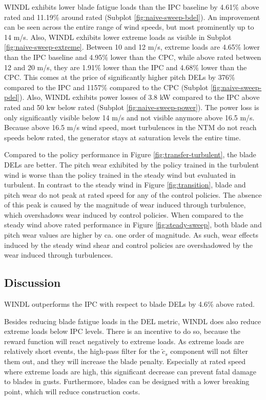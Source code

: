 WINDL exhibits lower blade fatigue loads than the IPC baseline by 4.61\% above rated and 11.19\% around rated (Subplot \ref{fig:naive-sweep-bdel}). An improvement can be seen across the entire range of wind speeds, but most prominently up to 14 m/s. Also, WINDL exhibits lower extreme loads as visible in Subplot \ref{fig:naive-sweep-extreme}. Between 10 and 12 m/s, extreme loads are 4.65\% lower than the IPC baseline and 4.95\% lower than the CPC, while above rated between 12 and 20 m/s, they are 1.91\% lower than the IPC and 4.68\% lower than the CPC. This comes at the price of significantly higher pitch DELs by 376\% compared to the IPC and 1157\% compared to the CPC (Subplot \ref{fig:naive-sweep-pdel}). Also, WINDL exhibits power losses of 3.8 kW compared to the IPC above rated and 50 kw below rated (Subplot \ref{fig:naive-sweep-power}). The power loss is only significantly visible below 14 m/s and not visible anymore above 16.5 m/s.  Because above 16.5 m/s wind speed, most turbulences in the \ac{NTM} do not reach speeds below rated, the generator stays at saturation levels the entire time.

Compared to the policy performance in Figure \ref{fig:transfer-turbulent}, the blade DELs are better. The pitch wear exhibited by the policy trained in the turbulent wind is worse than the policy trained in the steady wind but evaluated in turbulent. In contrast to the steady wind in Figure \ref{fig:transition}, blade and pitch wear do not peak at rated speed for any of the control policies. The absence of this peak is caused by the magnitude of wear induced through turbulence, which overshadows wear induced by control policies. When compared to the steady wind above rated performance in Figure \ref{fig:steady-sweep}, both blade and pitch wear values are higher by ca. one order of magnitude. As such, wear effects induced by the steady wind shear and control policies are overshadowed by the wear induced through turbulences.

\subsection{Discussion}

WINDL outperforms the IPC with respect to blade DELs by 4.6\% above rated. 

Besides reducing blade fatigue loads in the DEL metric, WINDL does also reduce extreme loads below IPC levels. There is an incentive to do so, because the reward function will react negatively to extreme loads. As extreme loads are relatively short events, the high-pass filter for the $\tilde c_s$ component will not filter them out, and they will increase the blade penalty. Especially at rated speed where extreme loads are high, this significant decrease can prevent fatal damage to blades in gusts. Furthermore, blades can be designed with a lower breaking point, which will reduce construction costs.

